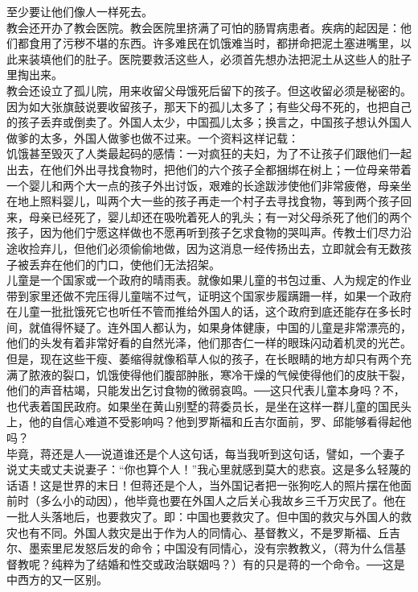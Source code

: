 至少要让他们像人一样死去。\\

教会还开办了教会医院。教会医院里挤满了可怕的肠胃病患者。疾病的起因是：他们都食用了污秽不堪的东西。许多难民在饥饿难当时，都拼命把泥土塞进嘴里，以此来装填他们的肚子。医院要救活这些人，必须首先想办法把泥土从这些人的肚子里掏出来。\\

教会还设立了孤儿院，用来收留父母饿死后留下的孩子。但这收留必须是秘密的。因为如大张旗鼓说要收留孩子，那天下的孤儿太多了；有些父母不死的，也把自己的孩子丢弃或倒卖了。外国人太少，中国孤儿太多；换言之，中国孩子想认外国人做爹的太多，外国人做爹也做不过来。一个资料这样记载：\\

饥饿甚至毁灭了人类最起码的感情：一对疯狂的夫妇，为了不让孩子们跟他们一起出去，在他们外出寻找食物时，把他们的六个孩子全都捆绑在树上；一位母亲带着一个婴儿和两个大一点的孩子外出讨饭，艰难的长途跋涉使他们非常疲倦，母亲坐在地上照料婴儿，叫两个大一些的孩子再走一个村子去寻找食物，等到两个孩子回来，母亲已经死了，婴儿却还在吸吮着死人的乳头；有一对父母杀死了他们的两个孩子，因为他们宁愿这样做也不愿再听到孩子乞求食物的哭叫声。传教士们尽力沿途收捡弃儿，但他们必须偷偷地做，因为这消息一经传扬出去，立即就会有无数孩子被丢弃在他们的门口，使他们无法招架。\\

儿童是一个国家或一个政府的晴雨表。就像如果儿童的书包过重、人为规定的作业带到家里还做不完压得儿童喘不过气，证明这个国家步履蹒跚一样，如果一个政府在儿童一批批饿死它也听任不管而推给外国人的话，这个政府到底还能存在多长时间，就值得怀疑了。连外国人都认为，如果身体健康，中国的儿童是非常漂亮的，他们的头发有着非常好看的自然光泽，他们那杏仁一样的眼珠闪动着机灵的光芒。但是，现在这些干瘦、萎缩得就像稻草人似的孩子，在长眼睛的地方却只有两个充满了脓液的裂口，饥饿使得他们腹部肿胀，寒冷干燥的气候使得他们的皮肤干裂，他们的声音枯竭，只能发出乞讨食物的微弱哀鸣。{\Add ──}这只代表儿童本身吗？不，也代表着国民政府。如果坐在黄山别墅的蒋委员长，是坐在这样一群儿童的国民头上，他的自信心难道不受影响吗？他到罗斯福和丘吉尔面前，罗、邱能够看得起他吗？\\

毕竟，蒋还是人{\Add ──}说道谁还是个人这句话，每当我听到这句话，譬如，一个妻子说丈夫或丈夫说妻子：“你也算个人！”我心里就感到莫大的悲哀。这是多么轻蔑的话语！这是世界的末日！但蒋还是个人，当外国记者把一张狗吃人的照片摆在他面前时（多么小的动因），他毕竟也要在外国人之后关心我故乡三千万灾民了。他在一批人头落地后，也要救灾了。即：中国也要救灾了。但中国的救灾与外国人的救灾也有不同。外国人救灾是出于作为人的同情心、基督教义，不是罗斯福、丘吉尔、墨索里尼发怒后发的命令；中国没有同情心，没有宗教教义，（蒋为什么信基督教呢？纯粹为了结婚和性交或政治联姻吗？）有的只是蒋的一个命令。{\Add ──}这是中西方的又一区别。\\

